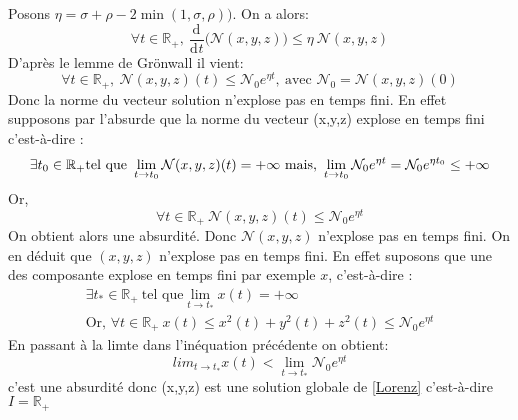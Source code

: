 \documentclass{article}
\newcommand{\R}{\mathbb{R}}
\newcommand{\deriv}[3][ ]{
    \ensuremath{\frac{\mathrm{d}^{#1}#2}{\mathrm{d}^{#1} #3}}
}
\newcommand{\cad}{c'est-\`a-dire }
\begin{document}
Posons $ \eta = \sigma + \rho - 2 \min (1,\sigma,\rho))$. On a alors: 
\[
    \forall t \in \R_+, \: \deriv{}{t}\bigg( \mathcal{N}(x,y,z)\bigg) \le \eta\: \mathcal{N}(x,y,z)
\]
D'après le lemme de Grönwall il vient:
\[
    \forall t \in \R_+,\: \mathcal{N}(x,y,z)(t) \le \mathcal{N}_0 e^{\eta t},\: \textrm{avec } \mathcal{N}_0 = \mathcal{N}(x,y,z)(0)
\]
Donc la norme du vecteur solution n'explose pas en temps fini. En effet supposons par l'absurde que la norme du vecteur (x,y,z) explose en temps fini \cad: 
\[
\exists t_0 \in \R_+ \textrm{tel que } \lim_{t \to t_0} \mathcal{N}(x,y,z)(t)=+\infty \  \textrm{mais, } \\
\lim_{t\to t_0} \mathcal{N}_0 e^{\eta t} = \mathcal{N}_0 e^{\eta t_0} \le + \infty
\]
Or,
\[\forall t \in \R_+ \: \mathcal{N}(x,y,z)(t) \le \mathcal{N}_0 e^{\eta t}
\]On obtient alors une absurdité. Donc $\mathcal{N}(x,y,z)$ n'explose pas en temps fini. On en déduit que $(x,y,z)$ n'explose pas en temps fini. En effet suposons que une des composante explose en temps fini par exemple $x$, \cad:
\begin{gather*}
    \exists t_* \in \R_+ \: \textrm{tel que} \lim_{t \to t_*} x(t) = + \infty\\
    \textrm{Or, } \forall t \in \R_+ \: x(t) \le x^2(t) + y^2(t) + z^2(t) \le \mathcal{N}_0 e^{\eta t}
\end{gather*}
En passant \`a la limte dans l'inéquation précédente on obtient:
\[
    lim_{t \to t_*} x(t) < \lim_{t \to t_*} \mathcal{N}_0 e^{\eta t}
\]
c'est une absurdité donc (x,y,z) est une solution globale de \eqref{Lorenz} \cad $I=\R_+$
\end{document}
